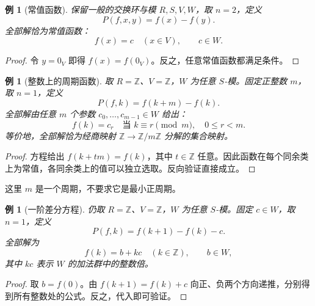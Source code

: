 \documentclass[11pt,a4paper,oneside,openany]{book}
\theoremstyle{lecture}
\newtheorem{example}[theorem]{例}
\numberwithin{equation}{section}
\begin{document}
\begin{example}[常值函数]
保留一般的交换环与模 $R,S,V,W$，取 $n=2$，定义
\[
 P(f,x,y)=f(x)-f(y).
\]
全部解恰为常值函数：
\[
 \boxed{f(x)=c\quad(x\in V),\qquad c\in W.}
\]
\end{example}
\begin{proof}
令 $y=0_V$ 即得 $f(x)=f(0_V)$。反之，任意常值函数都满足条件。
\end{proof}

\begin{example}[整数上的周期函数]
取 $R=\mathbb Z$、$V=\mathbb Z$，$W$ 为任意 $S$-模。固定正整数 $m$，取 $n=1$，定义
\[
 P(f,k)=f(k+m)-f(k).
\]
全部解由任意 $m$ 个参数 $c_0,\ldots,c_{m-1}\in W$ 给出：
\[
 \boxed{f(k)=c_r\quad\text{当 }k\equiv r\pmod m,\quad 0\le r<m.}
\]
等价地，全部解恰为经商映射 $\mathbb Z\to\mathbb Z/m\mathbb Z$ 分解的集合映射。
\end{example}
\begin{proof}
方程给出 $f(k+tm)=f(k)$，其中 $t\in\mathbb Z$ 任意。因此函数在每个同余类上为常值，各同余类上的值可以独立选取。反向验证直接成立。
\end{proof}
这里 $m$ 是一个周期，不要求它是最小正周期。

\begin{example}[一阶差分方程]
仍取 $R=\mathbb Z$、$V=\mathbb Z$，$W$ 为任意 $S$-模。固定 $c\in W$，取 $n=1$，定义
\[
 P(f,k)=f(k+1)-f(k)-c.
\]
全部解为
\[
 \boxed{f(k)=b+kc\quad(k\in\mathbb Z),\qquad b\in W,}
\]
其中 $kc$ 表示 $W$ 的加法群中的整数倍。
\end{example}
\begin{proof}
取 $b=f(0)$。由 $f(k+1)=f(k)+c$ 向正、负两个方向递推，分别得到所有整数处的公式。反之，代入即可验证。
\end{proof}
\end{document}
